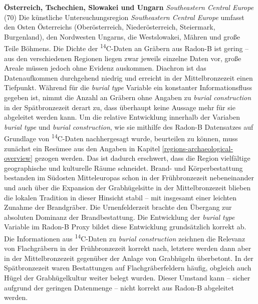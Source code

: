 \documentclass[openany,twoside,twocolumn]{book}
\begin{document}
\textbf{Österreich, Tschechien, Slowakei und Ungarn} \emph{Southeastern
Central Europe} (70) \newline  Die künstliche Untersuchungsregion
\emph{Southeastern Central Europe} umfasst den Osten Österreichs
(Oberösterreich, Niederösterreich, Steiermark, Burgenland), den
Nordwesten Ungarns, die Westslowakei, Mähren und große Teile Böhmens.
Die Dichte der \textsuperscript{14}C-Daten an Gräbern aus Radon-B ist
gering -- aus den verschiedenen Regionen liegen zwar jeweils einzelne
Daten vor, große Areale müssen jedoch ohne Evidenz auskommen. Diachron
ist das Datenaufkommen durchgehend niedrig und erreicht in der
Mittelbronzezeit einen Tiefpunkt. Während für die \emph{burial type}
Variable ein konstanter Informationsfluss gegeben ist, nimmt die Anzahl
an Gräbern ohne Angaben zu \emph{burial construction} in der
Spätbronzezeit derart zu, dass überhaupt keine Aussage mehr für sie
abgeleitet werden kann. Um die relative Entwicklung innerhalb der
Variaben \emph{burial type} und \emph{burial construction}, wie sie
mithilfe des Radon-B Datensatzes auf Grundlage von
\textsuperscript{14}C-Daten nachhergesagt wurde, beurteilen zu können,
muss zunächst ein Resümee aus den Angaben in Kapitel
\ref{regions-archaeological-overview} gezogen werden. Das ist dadurch
erschwert, dass die Region vielfältige geographische und kulturelle
Räume schneidet. Brand- und Körperbestattung bestanden im Südosten
Mitteleuropas schon in der Frühbronzezeit nebeneinander und auch über
die Expansion der Grabhügelsitte in der Mittelbronzezeit blieben die
lokalen Tradition in dieser Hinsicht stabil -- mit insgesamt einer
leichten Zunahme der Brandgräber. Die Urnenfelderzeit brachte den
Übergang zur absoluten Dominanz der Brandbestattung. Die Entwicklung der
\emph{burial type} Variable im Radon-B Proxy bildet diese Entwicklung
grundsätzlich korrekt ab. Die Informationen aus
\textsuperscript{14}C-Daten zu \emph{burial construction} zeichnen die
Relevanz von Flachgräbern in der Frühbronzezeit korrekt nach, letztere
werden dann aber in der Mittelbronzezeit gegenüber der Anlage von
Grabhügeln überbetont. In der Spätbronzezeit waren Bestattungen auf
Flachgräberfeldern häufig, obgleich auch Hügel der Grabhügelkultur
weiter belegt wurden. Dieser Umstand kann -- sicher aufgrund der
geringen Datenmenge -- nicht korrekt aus Radon-B abgeleitet werden.
\end{document}
